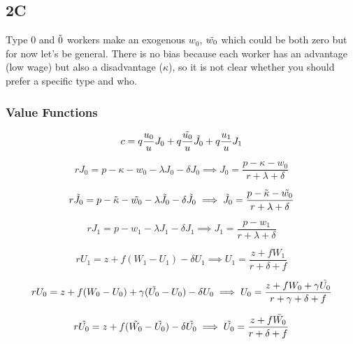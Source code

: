 \documentclass[12pt]{article} %
\theoremstyle{definition}
\begin{document}

\subsection{2C}
Type 0 and $\Tilde{0}$ workers make an exogenous $w_0$, $\Tilde{w_0}$ which could be both zero but for now let's be general. There is no bias because each worker has an advantage (low wage) but also a disadvantage ($\kappa$), so it is not clear whether you should prefer a specific type and who. 
\subsubsection{Value Functions}
\begin{equation}
    c = q \frac{u_0}{u}J_0 + q \frac{\Tilde{u_0}}{u} \Tilde{J_0} + q \frac{u_1}{u}J_1
\end{equation}

\begin{equation}
    rJ_0 =p-\kappa-w_0-\lambda J_0 - \delta J_0 \implies J_0 = \frac{p-
    \kappa-w_0}{r + \lambda + \delta}
\end{equation}

\begin{equation}
    r\Tilde{J_0} =p-\Tilde{\kappa}-\Tilde{w_0}-\lambda \Tilde{J_0} - \delta \Tilde{J_0} \implies \Tilde{J_0} = \frac{p-\Tilde{\kappa}-\Tilde{w_0}}{r + \lambda + \delta}
\end{equation}

\begin{equation}
    rJ_1 =p-w_1-\lambda J_1 - \delta J_1 \implies J_1 = \frac{p-w_1}{r + \lambda + \delta}
\end{equation}

\begin{equation}
    rU_1 =z+f(W_1-U_1)- \delta U_1 \implies U_1 = \frac{z + f W_1}{r + \delta + f}
\end{equation}

\begin{equation}
    rU_0 =z+f(W_0-U_0)+\gamma(\Tilde{U_0}-U_0) - \delta U_0 \implies U_0 = \frac{z + f W_0 + \gamma \Tilde{U_0}}{r + \gamma + \delta + f}
\end{equation}

\begin{equation}
    r\Tilde{U_0} =z+f(\Tilde{W_0}-\Tilde{U_0})- \delta \Tilde{U_0} \implies \Tilde{U_0} = \frac{z + f\Tilde{W_0}}{r + \delta + f}
\end{equation}
\end{document}
